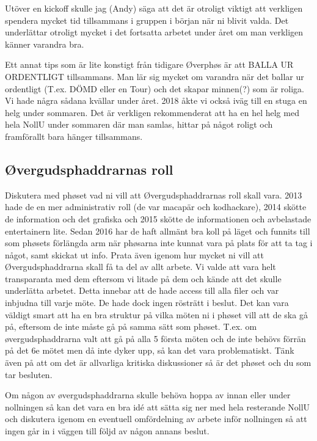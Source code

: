 \documentclass[10pt]{article}
\begin{document}
    Utöver en kickoff skulle jag (Andy) säga att det är otroligt viktigt att verkligen spendera mycket tid tillsammans i gruppen i början när ni blivit valda. Det underlättar otroligt mycket i det fortsatta arbetet under året om man verkligen känner varandra bra. 

    Ett annat tips som är lite konstigt från tidigare Øverphøs är att BALLA UR ORDENTLIGT tillsammans. Man lär sig mycket om varandra när det ballar ur ordentligt (T.ex. DÖMD eller en Tour) och det skapar minnen(?) som är roliga. Vi hade några sådana kvällar under året. 2018 åkte vi också iväg till en stuga en helg under sommaren. Det är verkligen rekommenderat att ha en hel helg med hela NollU under sommaren där man samlas, hittar på något roligt och framförallt bara hänger tillsammans.

    \subsection{Øvergudsphaddrarnas roll}
    Diskutera med phøset vad ni vill att Øvergudsphaddrarnas roll skall vara. 2013 hade de en mer administrativ roll (de var macapär och kodhackare), 2014 skötte de information och det grafiska och 2015 skötte de informationen och avbelastade entertainern lite. Sedan 2016 har de haft allmänt bra koll på läget och funnits till som phøsets förlängda arm när phøsarna inte kunnat vara på plats för att ta tag i något, samt skickat ut info. Prata även igenom hur mycket ni vill att Øvergudsphaddrarna skall få ta del av allt arbete. Vi valde att vara helt transparanta med dem eftersom vi litade på dem och kände att det skulle underlätta arbetet. Detta innebar att de hade access till alla filer och var inbjudna till varje möte. De hade dock ingen rösträtt i beslut. Det kan vara väldigt smart att ha en bra struktur på vilka möten ni i phøset vill att de ska gå på, eftersom de inte måste gå på samma sätt som phøset. T.ex. om øvergudsphaddrarna valt att gå på alla 5 första möten och de inte behövs förrän på det 6e mötet men då inte dyker upp, så kan det vara problematiskt. Tänk även på att om det är allvarliga kritiska diskussioner så är det phøset och du som tar besluten.

    Om någon av øvergudsphaddrarna skulle behöva hoppa av innan eller under nollningen så kan det vara en bra idé att sätta sig ner med hela resterande NollU och diskutera igenom en eventuell omfördelning av arbete inför nollningen så att ingen går in i väggen till följd av någon annans beslut.
\end{document}
